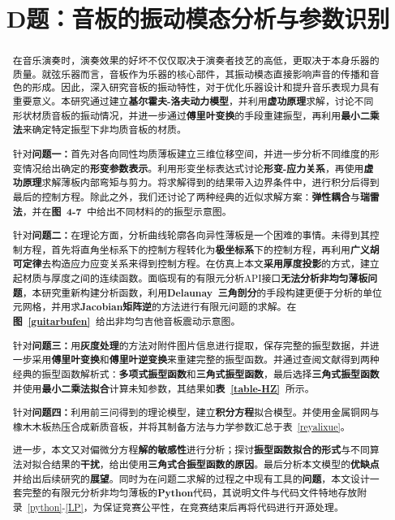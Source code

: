 \documentclass[withoutpreface,bwprint]{cumcmthesis} %
\title{D题：音板的振动模态分析与参数识别}
\begin{document}
 \maketitle
 \begin{abstract}
在音乐演奏时，演奏效果的好坏不仅仅取决于演奏者技艺的高低，更取决于本身乐器的质量。就弦乐器而言，音板作为乐器的核心部件，其振动模态直接影响声音的传播和音色的形成。因此，深入研究音板的振动特性，对于优化乐器设计和提升音乐表现力具有重要意义。本研究通过建立\textbf{基尔霍夫-洛夫动力模型}，并利用\textbf{虚功原理}求解，讨论不同形状材质音板的振动情况，并进一步通过\textbf{傅里叶变换}的手段重建振型，再利用\textbf{最小二乘法}来确定特定振型下非均质音板的材质。

针对\textbf{问题一：}首先对各向同性均质薄板建立三维位移空间，并进一步分析不同维度的形变情况给出确定的\textbf{形变参数表示}。利用形变坐标表达式讨论\textbf{形变-应力关系}，再使用\textbf{虚功原理}求解薄板内部弯矩与剪力。将求解得到的结果带入边界条件中，进行积分后得到最后的控制方程。除此之外，我们还讨论了两种经典的近似求解方案：\textbf{弹性耦合}与\textbf{瑞雷法}，并在\textbf{图~4-7~}中给出不同材料的的振型示意图。

针对\textbf{问题二：}在理论方面，分析曲线轮廓各向异性薄板是一个困难的事情。未得到其控制方程，首先将直角坐标系下的控制方程转化为\textbf{极坐标系}下的控制方程，再利用\textbf{广义胡可定律}去构造应力应变关系来得到控制方程。在仿真上本文\textbf{采用厚度投影}的方式，建立起材质与厚度之间的连续函数。面临现有的有限元分析API接口\textbf{无法分析非均匀薄板问题}，本研究重新构建分析函数，利用\textbf{Delaunay~三角剖分}的手段构建更便于分析的单位元网格，并用求\textbf{Jacobian矩阵逆}的方法进行有限元问题的求解。在\textbf{图~\ref{guitarbufen}~}给出非均匀吉他音板震动示意图。

针对\textbf{问题三：}用\textbf{灰度处理}的方法对附件图片信息进行提取，保存完整的振型数据，并进一步采用\textbf{傅里叶变换}和\textbf{傅里叶逆变换}来重建完整的振型函数。并通过查阅文献得到两种经典的振型函数解析式：\textbf{多项式振型函数}和\textbf{三角式振型函数}，最后选择\textbf{三角式振型函数}并使用\textbf{最小二乘法拟合}计算未知参数，其结果如\textbf{表~\ref{table-HZ}~}所示。

针对\textbf{问题四：}利用前三问得到的理论模型，建立\textbf{积分方程}拟合模型。并使用金属铜网与橡木木板热压合成新质音板，并将其制备方法与力学参数汇总于表~\ref{reyalixue}。

进一步，本文又对偏微分方程\textbf{解的敏感性}进行分析；探讨\textbf{振型函数拟合的形式}与不同算法对拟合结果的\textbf{干扰}，给出使用\textbf{三角式合振型函数的原因}。最后分析本文模型的\textbf{优缺点}并给出后续研究的\textbf{展望}。同时为在问题二求解的过程之中现有工具的\textbf{问题}，本文设计一套完整的有限元分析非均匀薄板的\textbf{Python}代码，其说明文件与代码文件特地存放附录~\ref{python}-\ref{LP}，为保证竞赛公平性，在竞赛结束后再将代码进行开源处理。

\end{abstract}
\end{document}
